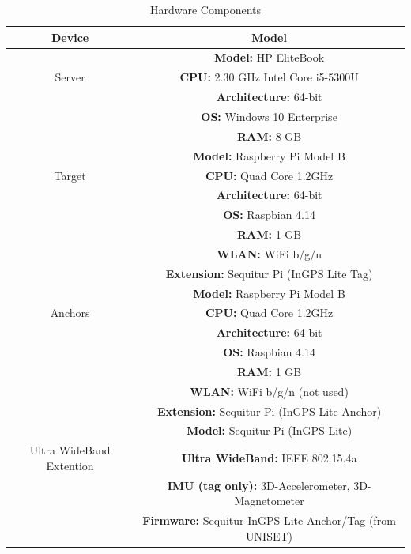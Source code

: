 \begin{table}
\caption{Hardware Components}
\label{tab:hardware_specification}
\centering
\begin{tabular}{| c | c |}
\toprule
\textbf{Device} & \textbf{Model}\\
\midrule
& \textbf{Model:} HP EliteBook\\
Server & \textbf{CPU:} 2.30 GHz Intel Core i5-5300U\\
& \textbf{Architecture:} 64-bit\\
& \textbf{OS:} Windows 10 Enterprise\\
& \textbf{RAM:} 8 GB\\
\midrule
& \textbf{Model:} Raspberry Pi Model B\\
Target & \textbf{CPU:} Quad Core 1.2GHz\\
& \textbf{Architecture:} 64-bit\\
& \textbf{OS:} Raspbian 4.14\\
& \textbf{RAM:} 1 GB\\
& \textbf{WLAN:} WiFi b/g/n\\
& \textbf{Extension:} Sequitur Pi (InGPS Lite Tag)\\
\midrule
& \textbf{Model:} Raspberry Pi Model B\\
Anchors & \textbf{CPU:} Quad Core 1.2GHz\\
& \textbf{Architecture:} 64-bit\\
& \textbf{OS:} Raspbian 4.14\\
& \textbf{RAM:} 1 GB\\
& \textbf{WLAN:} WiFi b/g/n (not used)\\
& \textbf{Extension:} Sequitur Pi (InGPS Lite Anchor)\\
\midrule
& \textbf{Model:} Sequitur Pi (InGPS Lite)\\
Ultra WideBand Extention & \textbf{Ultra WideBand:} IEEE 802.15.4a\\
& \textbf{IMU (tag only):} 3D-Accelerometer, 3D-Magnetometer\\
& \textbf{Firmware:} Sequitur InGPS Lite Anchor/Tag (from UNISET)\\
\bottomrule
\end{tabular}
\end{table}


